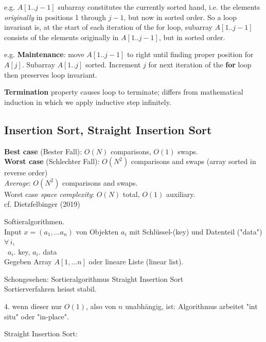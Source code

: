 \documentclass[10pt]{amsart}
\begin{document}
e.g. $A[1.. j-1]$ subarray constitutes the currently sorted hand, i.e. the elements \emph{originally} in positions 1 through $j-1$, but now in sorted order. So a loop invariant is, at the start of each iteration of the for loop, subarray $A[1.. j-1]$ consists of the elements originally in $A[1..j-1]$, but in sorted order.

e.g. \textbf{Maintenance}: move $A[1..j-1]$ to right until finding proper position for $A[j]$. Subarray $A[1..j]$ sorted. Increment $j$ for next iteration of the \textbf{for} loop then preserves loop invariant.

\textbf{Termination} property causes loop to terminate; differs from mathematical induction in which we apply inductive step infinitely.



\subsection{Insertion Sort, Straight Insertion Sort}

\textbf{Best case} (Bester Fall): $O(N)$ comparisons, $O(1)$ swaps. \\
\textbf{Worst case} (Schlechter Fall): $O(N^2)$ comparisons and swaps (array sorted in reverse order) \\
\emph{Average}: $O(N^2)$ comparisons and swaps. \\

Worst case \emph{space complexity}: $O(N)$ total, $O(1)$ auxiliary. \\

cf. Dietzfelbinger (2019) \cite{Diet2019}

Softieralgorithmen. \\

Input $x = (a_1, \dots a_n)$ von Objekten $a_i$ mit Schl\"{u}ssel-(key) und Datenteil ("data") $\forall \, i$, \\
\quad \quad \, $a_i .$ key, $a_i . $ data \\

Gegeben Array $A[1,\dots n]$ oder lineare Liste (linear list).

Schongesehen: Sortieralgorithmus Straight Insertion Sort \\
Sortierverfahren heisst stabil.

4. wenn dieser nur $O(1)$, also von $n$ unabh\"{a}ngig, ist: Algorithmus arbeitet "int situ" oder "in-place".

Straight Insertion Sort: \\
\end{document}
